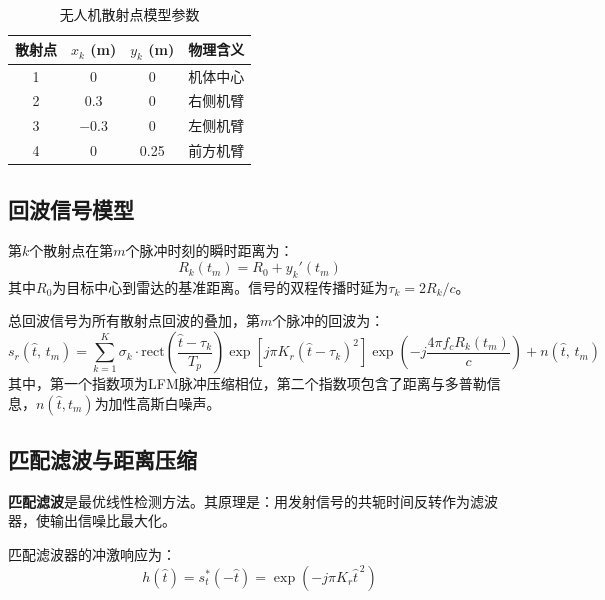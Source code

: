 \documentclass[12pt, a4paper]{article}
\begin{document}
\begin{table}[H]
\centering
\begin{tabularx}{0.7\textwidth}{cCCC}
\toprule
{}\color{white}\bfseries 散射点 &
  \color{white}\bfseries $x_k$ (m) &
  \color{white}\bfseries $y_k$ (m) &
  \color{white}\bfseries 物理含义 \\
 & 0 & 0 & 机体中心 \\
2 & 0.3 & 0 & 右侧机臂 \\
3 & $-$0.3 & 0 & 左侧机臂 \\
4 & 0 & 0.25 & 前方机臂 \\
\bottomrule
\end{tabularx}
\caption{无人机散射点模型参数}
\label{tab:scatter}
\end{table}

\subsection{回波信号模型}

第$k$个散射点在第$m$个脉冲时刻的瞬时距离为：
\begin{equation}
  R_k(t_m) = R_0 + y_k'(t_m)
  \label{eq:range}
\end{equation}
其中$R_0$为目标中心到雷达的基准距离。信号的双程传播时延为$\tau_k = 2R_k/c$。

总回波信号为所有散射点回波的叠加，第$m$个脉冲的回波为：
\begin{equation}
  s_r(\hat{t},\, t_m) = \sum_{k=1}^{K} \sigma_k \cdot
  \mathrm{rect}\!\left(\frac{\hat{t}-\tau_k}{T_p}\right)
  \exp\!\left[j\pi K_r\!\left(\hat{t}-\tau_k\right)^{2}\right]
  \exp\!\left(-j\frac{4\pi f_c R_k(t_m)}{c}\right)
  + n(\hat{t},\, t_m)
  \label{eq:echo}
\end{equation}
其中，第一个指数项为LFM脉冲压缩相位，第二个指数项包含了距离与多普勒信息，$n(\hat{t},\allowbreak t_m)$为加性高斯白噪声。

\subsection{匹配滤波与距离压缩}
\label{subsec:matched_filter}

\textbf{匹配滤波}是最优线性检测方法。其原理是：用发射信号的共轭时间反转作为滤波器，使输出信噪比最大化\cite{ref_radar_signal}。

匹配滤波器的冲激响应为：
\begin{equation}
  h(\hat{t}) = s_t^{*}(-\hat{t}) = \exp\!\left(-j\pi K_r \hat{t}^{\,2}\right)
  \label{eq:matched_filter}
\end{equation}
\end{document}
